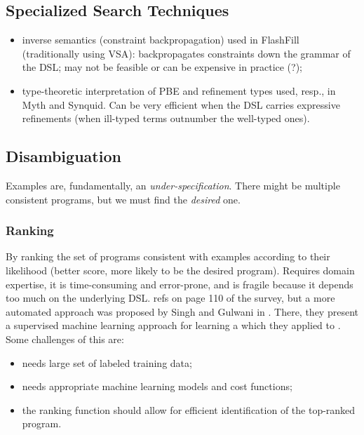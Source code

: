\subsection{Specialized Search Techniques}
\label{sec:pbe-search-techniques}



\begin{itemize}
\item inverse semantics (constraint backpropagation) used in FlashFill
(traditionally using \ac{VSA}): backpropagates constraints down the grammar of
the \ac{DSL}; may not be feasible or can be expensive in practice (?);
\item type-theoretic interpretation of \ac{PBE} and refinement types used, resp.,
in Myth and Synquid. Can be very efficient when the \ac{DSL} carries expressive
refinements (when ill-typed terms outnumber the well-typed ones).
\end{itemize}

\subsection{Disambiguation}
\label{sec:resolving-ambiguity}

Examples are, fundamentally, an \textit{under-specification}. There might be
multiple consistent programs, but we must find the \textit{desired} one.

\subsubsection{Ranking}

 By ranking the set of programs
consistent with examples according to their likelihood (better score, more
likely to be the desired program). Requires domain expertise, it is
time-consuming and error-prone, and is fragile because it depends too much on
the underlying \ac{DSL}.  {refs on page 110 of the survey},
but a more automated approach was proposed by Singh and Gulwani in
\cite{Singh:ranking:2015}. There, they present a supervised machine learning
approach for learning a  which
they applied to . Some challenges of this are:
\begin{itemize}
\item needs large set of labeled training data;
\item needs appropriate machine learning models and cost functions;
\item the ranking function should allow for efficient identification of the
  top-ranked program.
\end{itemize}

